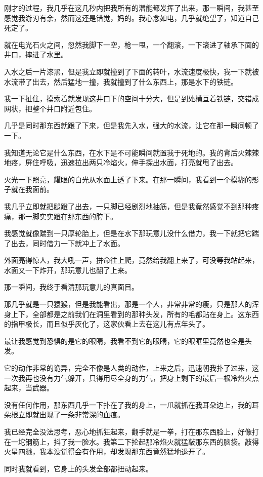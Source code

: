 刚才的过程，我几乎在这几秒内把我所有的潜能都发挥了出来，那一瞬间，我甚至感觉我游刃有余，然而这还是错觉，妈的。我心念如电，几乎就绝望了，知道自己死定了。

就在电光石火之间，忽然我脚下一空，枪一甩，一个翻滚，一下滚进了轴承下面的井口，摔进了水里。

入水之后一片漆黑，但是我立即就撞到了下面的转叶，水流速度极快，我一下就被水流带了出去，然后猛地一撞，我就撞到了什么东西上，那是水下的铁链。

我一下扯住，摸索着就发现这井口下的空间十分大，但是到处横亘着铁链，交错成网状，把整个井口附近包住。

几乎是同时那东西就跟了下来，但是我先入水，强大的水流，让它在那一瞬间顿了一下。

我知道无论它是什么东西，在水下是不可能瞬间就置我于死地的。我的背后火辣辣地疼，屏住呼吸，迅速拉出两只冷焰火，伸手探出水面，打亮就甩了出去。

火光一下照亮，耀眼的白光从水面上透了下来。在那一瞬间，我看到一个模糊的影子就在我面前。

我几乎立即就把腿蹬了出去，一只脚已经剧烈地抽筋，但是我竟然感觉不到那种疼痛，那一脚实实蹬在那东西的胯下。

我感觉就像踹到一只厚轮胎上，但是在水下那玩意儿没什么借力，我一下就把它踹了出去，同时借力一下就冲上了水面。

外面亮得惊人，我大吼一声，拼命往上爬，竟然给我翻上来了，可没等我站起来，水面又一下炸开，那玩意儿也翻了上来。

那一瞬间，我终于看清那玩意儿的真面目。

那几乎就是一只猿猴，但是我能看出，那是一个人，非常非常的瘦，只是那人的浑身上下，全部都是之前我们在洞里看到的那种头发，所有的毛都贴在身上。这东西的指甲极长，而且似乎灰化了，这家伙看上去在这儿有点年头了。

最让我感觉到恐惧的是它的眼睛，我看不到它的眼睛，它的眼眶里竟然也全是头发。

它的动作非常的诡异，完全不像是人类的动作，上来之后，迅速朝我扑了过来，这一次我再也没有力气躲开，只得用尽全身的力气，把身上剩下的最后一根冷焰火点起来，当武器。

没有任何作用，那东西几乎一下扑在了我的身上，一爪就抓在我耳朵边上，我的耳朵根立即就出现了一条非常深的血痕。

我已经完全没法思考，恶心地抓狂起来，翻手就是一拳，打在那东西脸上，好像打在一坨钢筋上，抖了我一脸水。我第二下抡起那冷焰火就猛敲那东西的脑袋。敲得火星四溅，我本没觉得会有作用，却发现那东西竟然猛地退开了。

同时我就看到，它身上的头发全部都扭动起来。

